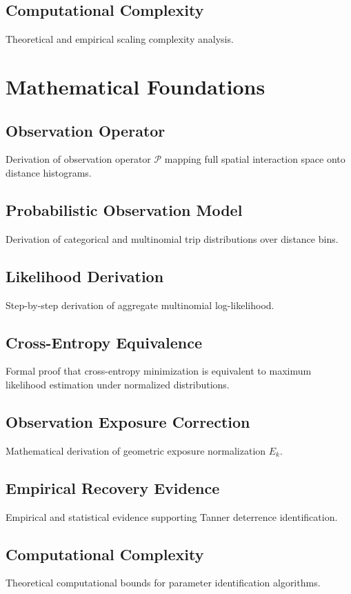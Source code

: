 \documentclass[pdflatex,sn-basic,iicol]{sn-jnl}
\begin{document}
\begin{appendices}
\subsection{Computational Complexity}
Theoretical and empirical scaling complexity analysis.

\section{Mathematical Foundations}\label{app:math}
\subsection{Observation Operator}
Derivation of observation operator $\mathcal{P}$ mapping full spatial interaction space onto distance histograms.

\subsection{Probabilistic Observation Model}
Derivation of categorical and multinomial trip distributions over distance bins.

\subsection{Likelihood Derivation}
Step-by-step derivation of aggregate multinomial log-likelihood.

\subsection{Cross-Entropy Equivalence}
Formal proof that cross-entropy minimization is equivalent to maximum likelihood estimation under normalized distributions.

\subsection{Observation Exposure Correction}
Mathematical derivation of geometric exposure normalization $E_k$.

\subsection{Empirical Recovery Evidence}
Empirical and statistical evidence supporting Tanner deterrence identification.

\subsection{Computational Complexity}
Theoretical computational bounds for parameter identification algorithms.


\end{appendices}
\end{document}
